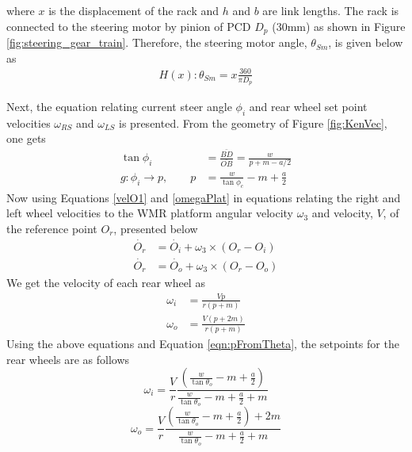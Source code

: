 where $x$ is the displacement of the rack and $h$ and $b$ are link lengths. The rack is connected to the steering motor by pinion of PCD $D_p$ (30mm) as shown in  Figure \ref{fig:steering_gear_train}. Therefore, the steering motor angle,  $ \theta_{Sm}$, is given below as
\begin{eqnarray}
H(x): \theta_{Sm}= x \frac{360}{\pi D_p}
\label{eqn:sterineq2}
\end{eqnarray}
 
Next,  the equation relating current steer angle $\phi_{i}$   and rear wheel  set point velocities $\omega_{RS}$ and $\omega_{LS}$ is presented. From the geometry of Figure \ref{fig:KenVec}, one gets
\begin{align}
\nonumber \tan\phi_{i} &=\frac{\bar{BD}}{\bar{OB}}=\frac{w}{p+m-a/2}\\ 
g:\phi_{i} \rightarrow p,\quad \quad p &= \frac{w}{\tan\phi_{c}}-m + \frac{a}{2}
\label{eqn:pFromTheta}
\end{align}
Now using Equations \ref{velO1} and \ref{omegaPlat}  in equations relating the right and left wheel velocities to the WMR platform angular velocity $\omega_3$ and velocity, $V$, of the reference point $O_r$, presented below
\begin{align*}
\dot{O_r}&=\dot{O_i}+\omega_3 \times (O_r-O_i)\\
\dot{O_r}&=\dot{O_o}+\omega_3 \times (O_r-O_o)
\end{align*}
 We get the  velocity of each rear wheel as  
\begin{align}
\nonumber \omega_i&=\frac{Vp}{r(p+m)}\\
\nonumber \omega_o &=\frac{V(p+2m)}{r(p+m)}
\end{align}
Using the above equations and Equation \ref{eqn:pFromTheta},  the setpoints for the rear wheels are as follows 
\begin{equation}
\omega_i =\frac{V}{r}\frac{( \frac{w}{\tan\theta_o}-m + \frac{a}{2})}{ \frac{w}{\tan\theta_o}-m + \frac{a}{2}+m}
\end{equation}
\begin{equation}
\omega_o =\frac{V}{r}\frac{( \frac{w}{\tan\theta_o}-m + \frac{a}{2})+2m}{ \frac{w}{\tan\theta_o}-m + \frac{a}{2}+m}
\end{equation}
 


